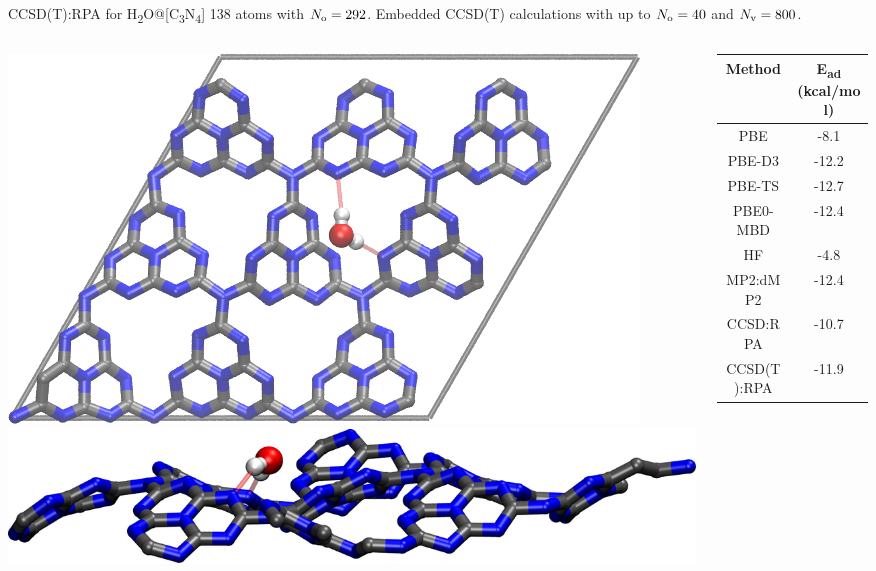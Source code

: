 \begin{block}{\large %
  CCSD(T):RPA for %
  H\textsubscript{2}O@[C\textsubscript{3}N\textsubscript{4}]%
  }
  138 atoms with $N_{\rm o}=292$. Embedded CCSD(T) calculations with
  up to $N_{\rm o}=40$ and $N_{\rm v}=800$\cite{schafer2021}.\\
  \begin{columns}
    \begin{column}{.49\linewidth}
      \includegraphics[width=\textwidth]{./figures/h2o_gc3n4_topview.png}\\
      \bigskip
      \includegraphics[width=\textwidth]{./figures/h2o_gc3n4_sideview.png}
    \end{column}
    \begin{column}{.49\linewidth}
      \begin{tabular}{ c|c } 
        {\small Method } & {\small  E\textsubscript{ad} (kcal/mol) }\\
        \hline
        PBE & -8.1  \\ 
        PBE-D3 & -12.2 \\ 
        PBE-TS & -12.7 \\ 
        PBE0-MBD & -12.4 \\ 
        HF & -4.8 \\
        {\small  MP2:dMP2 } & -12.4 \\
        {\small  CCSD:RPA } & -10.7 \\
        {\small  CCSD(T):RPA } & -11.9
      \end{tabular}
    \end{column}
  \end{columns}
\end{block}
